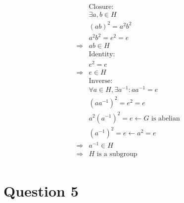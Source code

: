 \documentclass{article}
\begin{document}
\begin{equation*}
    \begin{split}
        &\text{Closure}:\\
        &\exists a,b\in H\\
        &(ab)^2=a^2b^2\\
        &a^2b^2=e^2=e\\
        \Rightarrow&ab\in H\\
        &\text{Identity}:\\
        &e^2=e\\
        \Rightarrow&e\in H\\
        &\text{Inverse}:\\
        &\forall a\in H,\exists a^{-1}:aa^{-1}=e\\
        &(aa^{-1})^2=e^2=e\\
        &a^2(a^{-1})^2=e\leftarrow G\text{ is abelian}\\
        &(a^{-1})^2=e\leftarrow a^2=e\\
        \Rightarrow&a^{-1}\in H\\
        \Rightarrow&H\text{ is a subgroup}\\
    \end{split}
\end{equation*}

\newpage

\section*{Question 5}

~
\end{document}
